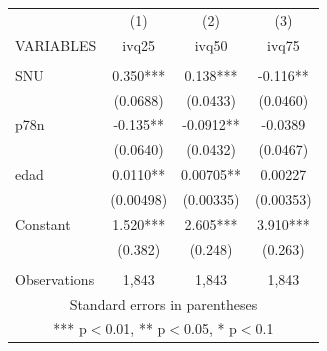 \begin{tabular}{lccc} \hline
 & (1) & (2) & (3) \\
VARIABLES & ivq25 & ivq50 & ivq75 \\ \hline
 &  &  &  \\
SNU & 0.350*** & 0.138*** & -0.116** \\
 & (0.0688) & (0.0433) & (0.0460) \\
p78n & -0.135** & -0.0912** & -0.0389 \\
 & (0.0640) & (0.0432) & (0.0467) \\
edad & 0.0110** & 0.00705** & 0.00227 \\
 & (0.00498) & (0.00335) & (0.00353) \\
Constant & 1.520*** & 2.605*** & 3.910*** \\
 & (0.382) & (0.248) & (0.263) \\
 &  &  &  \\
 Observations & 1,843 & 1,843 & 1,843 \\ \hline
\multicolumn{4}{c}{ Standard errors in parentheses} \\
\multicolumn{4}{c}{ *** p$<$0.01, ** p$<$0.05, * p$<$0.1} \\
\end{tabular}
